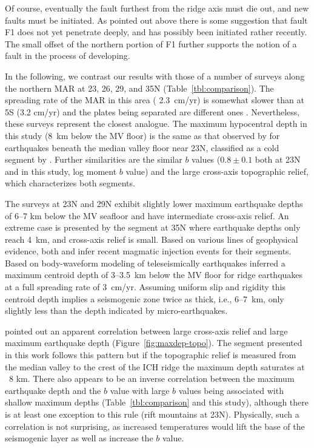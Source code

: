 \documentclass[jgr]{agu2001}
\newlength{\tw}
\begin{document}
\begin{article}
Of course, eventually the fault furthest
from the ridge axis must die out, and new faults must be
initiated. As pointed out above there is some suggestion that fault
F1 does not yet penetrate deeply, and has possibly been initiated
rather recently. The small offset of the northern portion of F1
further supports the notion of a fault in the process of developing.

In the following, we contrast our results with those of a number of
surveys along the northern MAR at 23\dg, 26\dg, 29\dg,  and 35\dg N (Table~\ref{tbl:comparison}).  The spreading
rate of the MAR in this area ( 2.3~cm/yr) is somewhat slower than
at 5\dg S (3.2 cm/yr) and the plates being separated are different
ones \citep{demets94}.
Nevertheless, these surveys represent the closest analogue.
The maximum hypocentral depth in this study (8~km below the MV
floor) is the same as that
observed by \citet{toomey88} for earthquakes beneath the median valley
floor near 23\dg N, classified as a cold segment by \citet{thibaud98}. Further similarities are the
similar $b$ values ($0.8\pm0.1$ both at 23\dg N and in this
study, log moment $b$ value) and the large cross-axis topographic relief, which
characterizes both segments.

The surveys at 23\dg N \citep{kong92} and 29\dg N \citep{wolfe95}
exhibit slightly lower maximum earthquake depths of 6--7 km below the
MV seafloor and have intermediate cross-axis relief.  An extreme case is
presented by the segment at 35\dg N \citep{barclay01} where earthquake
depths only reach 4~km, and cross-axis relief is small.  Based on
various lines of geophysical evidence, both
\citet{kong92} and \citet{barclay01} infer recent magmatic injection
events for their segments.
Based on body-waveform modeling of teleseismically  earthquakes
\citet{huang88} inferred a maximum centroid depth of 3--3.5~km below
the MV floor for ridge earthquakes at a full spreading rate of
3~cm/yr. Assuming uniform slip and rigidity this centroid depth
implies a seismogenic zone twice as thick, i.e., 6--7~km, only
slightly less than the depth indicated by micro-earthquakes.

\citet{barclay01} pointed out an apparent correlation between
large cross-axis relief and large maximum earthquake depth
(Figure~\ref{fig:maxdep-topo}).  The segment presented in this work
follows this pattern but if the topographic relief is measured
from the median valley to the crest of the ICH ridge the maximum depth saturates at ~8 km.
There also appears to be an inverse correlation
between the maximum earthquake depth and the $b$ value with
large $b$ values being associated with shallow maximum depths
(Table~\ref{tbl:comparison} and this study),
although there is at least one exception to this rule (rift mountains
at 23\dg N).  Physically, such a correlation is not surprising, as
increased temperatures would lift the base of the seismogenic
layer as well as increase the $b$ value.  


\end{article}
\end{document}
